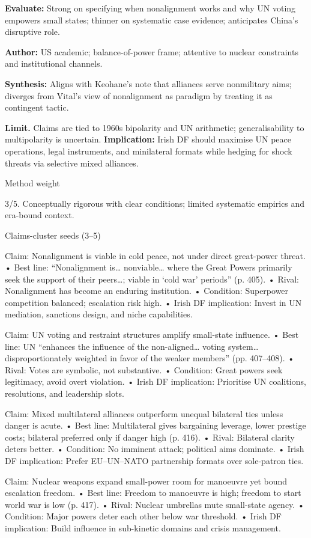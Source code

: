 \textbf{Evaluate:} Strong on specifying when nonalignment works and why UN voting empowers small states; thinner on systematic case evidence; anticipates China’s disruptive role.

\textbf{Author:} US academic; balance-of-power frame; attentive to nuclear constraints and institutional channels.

\textbf{Synthesis:} Aligns with Keohane’s note that alliances serve nonmilitary aims; diverges from Vital’s view of nonalignment as paradigm by treating it as contingent tactic.

\textbf{Limit.} Claims are tied to 1960s bipolarity and UN arithmetic; generalisability to multipolarity is uncertain. \textbf{Implication:} Irish DF should maximise UN peace operations, legal instruments, and minilateral formats while hedging for shock threats via selective mixed alliances.

Method weight

3/5. Conceptually rigorous with clear conditions; limited systematic empirics and era-bound context.

Claims-cluster seeds (3–5)

Claim: Nonalignment is viable in cold peace, not under direct great-power threat.
• Best line: “Nonalignment is… nonviable… where the Great Powers primarily seek the support of their peers…; viable in ‘cold war’ periods” (p. 405).
• Rival: Nonalignment has become an enduring institution.
• Condition: Superpower competition balanced; escalation risk high.
• Irish DF implication: Invest in UN mediation, sanctions design, and niche capabilities.

Claim: UN voting and restraint structures amplify small-state influence.
• Best line: UN “enhances the influence of the non-aligned… voting system… disproportionately weighted in favor of the weaker members” (pp. 407–408).
• Rival: Votes are symbolic, not substantive.
• Condition: Great powers seek legitimacy, avoid overt violation.
• Irish DF implication: Prioritise UN coalitions, resolutions, and leadership slots.

Claim: Mixed multilateral alliances outperform unequal bilateral ties unless danger is acute.
• Best line: Multilateral gives bargaining leverage, lower prestige costs; bilateral preferred only if danger high (p. 416).
• Rival: Bilateral clarity deters better.
• Condition: No imminent attack; political aims dominate.
• Irish DF implication: Prefer EU–UN–NATO partnership formats over sole-patron ties.

Claim: Nuclear weapons expand small-power room for manoeuvre yet bound escalation freedom.
• Best line: Freedom to manoeuvre is high; freedom to start world war is low (p. 417).
• Rival: Nuclear umbrellas mute small-state agency.
• Condition: Major powers deter each other below war threshold.
• Irish DF implication: Build influence in sub-kinetic domains and crisis management.

